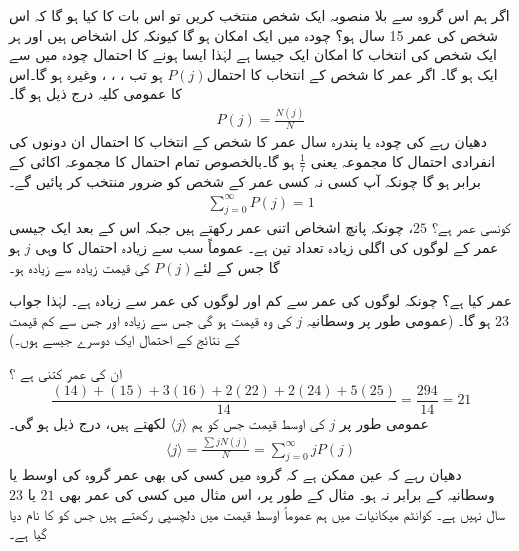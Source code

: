 \quad
اگر ہم اس گروہ سے بلا منصوبہ ایک شخص منتخب کریں تو اس بات کا کیا  ہو گا کہ اس شخص کی عمر 15 سال ہو؟
\quad
چودہ میں ایک امکان  ہو گا کیونکہ کل   اشخاص ہیں اور ہر ایک شخص کی انتخاب کا امکان ایک جیسا ہے لہٰذا ایسا ہونے کا احتمال چودہ میں سے ایک ہو گا۔  اگر   عمر کا شخص کے انتخاب کا احتمال\( P(j) \) ہو تب ، ، ، وغیرہ ہو گا۔اس کا عمومی کلیہ درج ذیل ہو گا۔
\begin{align}
P(j) = \frac{N(j)}{N} 
\end{align}
دھیان رہے کی چودہ یا پندرہ سال عمر کا شخص کے انتخاب کا احتمال ان دونوں کی انفرادی احتمال کا مجموعہ یعنی \( \frac{1}{7} \) ہو گا۔بالخصوص تمام احتمال کا مجموعہ اکائی  کے برابر ہو گا چونکہ آپ کسی نہ کسی عمر کے شخص کو ضرور منتخب کر پائیں گے۔ 
\begin{align}\label{مساوات_تفاعل_موج_کل_احتمال_اکائی}
\sum_{j=0}^{\infty} P(j) = 1
\end{align}
\quad
کونسی عمر     ہے؟
 \quad 
\( 25 \)،  چونکہ پانچ اشخاص اتنی عمر رکھتے ہیں جبکہ اس کے بعد ایک جیسی عمر کے لوگوں کی اگلی زیادہ  تعداد تین ہے۔ عموماً سب سے زیادہ احتمال کا  وہی \( j \) ہو گا جس کے لئے\( P(j) \) کی قیمت زیادہ سے زیادہ ہو۔ 

  عمر کیا ہے؟  \quad
چونکہ  لوگوں کی عمر  سے کم اور  لوگوں  کی  عمر  سے زیادہ ہے۔ لہٰذا  جواب \( 23 \) ہو گا۔ (عمومی طور پر وسطانیہ \( j \) کی وہ قیمت ہو گی جس سے زیادہ  اور جس سے کم قیمت کے نتائج کے احتمال  ایک دوسرے جیسے ہوں۔)

\quad
ان  کی   عمر کتنی ہے ؟ 
\[ \frac{(14)+(15)+3(16)+2(22)+2(24)+5(25)}{14} = \frac{294}{14}=21 \]
عمومی طور پر \( j \) کی اوسط قیمت جس کو ہم  \( \langle j \rangle \) لکھتے ہیں، درج ذیل ہو گی۔ 
\begin{align}\label{مساوات_تفاعل_موج_اوسط}
\langle j \rangle = \frac{\sum  j N(j)}{N} = \sum_{j=0}^{\infty} jP(j) 
\end{align}
دھیان رہے کہ عین ممکن ہے کہ گروہ میں کسی کی بھی عمر گروہ کی اوسط یا وسطانیہ  کے برابر نہ ہو۔ مثال کے طور پر،  اس مثال میں کسی کی عمر بھی  \( 21 \) یا \( 23 \) سال نہیں ہے۔ کوانٹم میکانیات میں ہم عموماً اوسط قیمت میں دلچسپی رکھتے ہیں جس کو   کا نام دیا گیا ہے۔ 

